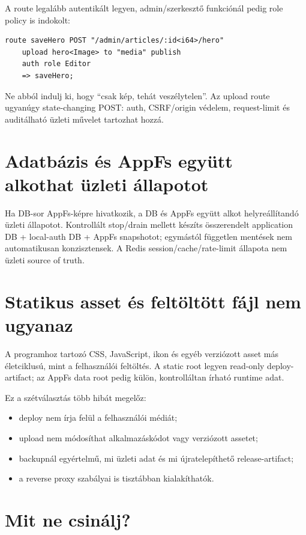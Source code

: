 A route legalább autentikált legyen, admin/szerkesztő funkciónál pedig role policy is indokolt:

\begin{lstlisting}[language=Velran]
route saveHero POST "/admin/articles/:id<i64>/hero"
    upload hero<Image> to "media" publish
    auth role Editor
    => saveHero;
\end{lstlisting}

Ne abból indulj ki, hogy ``csak kép, tehát veszélytelen''. Az upload route ugyanúgy state-changing POST: auth, CSRF/origin védelem, request-limit és auditálható üzleti művelet tartozhat hozzá.

\section{Adatbázis és AppFs együtt alkothat üzleti állapotot}

Ha DB-sor AppFs-képre hivatkozik, a DB és AppFs együtt alkot helyreállítandó üzleti állapotot. Kontrollált stop/drain mellett készíts összerendelt application DB + local-auth DB + AppFs snapshotot; egymástól független mentések nem automatikusan konzisztensek. A Redis session/cache/rate-limit állapota nem üzleti source of truth.

\section{Statikus asset és feltöltött fájl nem ugyanaz}

A programhoz tartozó CSS, JavaScript, ikon és egyéb verziózott asset más életciklusú, mint a felhasználói feltöltés. A static root legyen read-only deploy-artifact; az AppFs data root pedig külön, kontrolláltan írható runtime adat.

Ez a szétválasztás több hibát megelőz:

\begin{itemize}
  \item deploy nem írja felül a felhasználói médiát;
  \item upload nem módosíthat alkalmazáskódot vagy verziózott assetet;
  \item backupnál egyértelmű, mi üzleti adat és mi újratelepíthető release-artifact;
  \item a reverse proxy szabályai is tisztábban kialakíthatók.
\end{itemize}

\section{Mit ne csinálj?}

